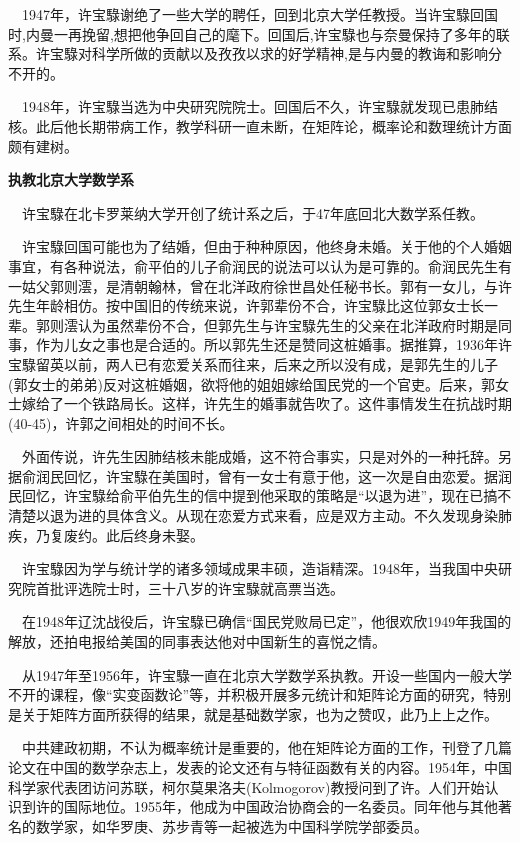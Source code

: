 $\quad$1947年，许宝騄谢绝了一些大学的聘任，回到北京大学任教授。当许宝騄回国时,内曼一再挽留,想把他争回自己的麾下。回国后,许宝騄也与奈曼保持了多年的联系。许宝騄对科学所做的贡献以及孜孜以求的好学精神,是与内曼的教诲和影响分不开的。

$\quad$1948年，许宝騄当选为中央研究院院士。回国后不久，许宝騄就发现已患肺结核。此后他长期带病工作，教学科研一直未断，在矩阵论，概率论和数理统计方面颇有建树。

\textbf{执教北京大学数学系}

$\quad$许宝騄在北卡罗莱纳大学开创了统计系之后，于47年底回北大数学系任教。

$\quad$许宝騄回国可能也为了结婚，但由于种种原因，他终身未婚。关于他的个人婚姻事宜，有各种说法，俞平伯的儿子俞润民的说法可以认为是可靠的。俞润民先生有一姑父郭则澐，是清朝翰林，曾在北洋政府徐世昌处任秘书长。郭有一女儿，与许先生年龄相仿。按中国旧的传统来说，许郭辈份不合，许宝騄比这位郭女士长一辈。郭则澐认为虽然辈份不合，但郭先生与许宝騄先生的父亲在北洋政府时期是同事，作为儿女之事也是合适的。所以郭先生还是赞同这桩婚事。据推算，1936年许宝騄留英以前，两人已有恋爱关系而往来，后来之所以没有成，是郭先生的儿子(郭女士的弟弟)反对这桩婚姻，欲将他的姐姐嫁给国民党的一个官吏。后来，郭女士嫁给了一个铁路局长。这样，许先生的婚事就告吹了。这件事情发生在抗战时期(40-45)，许郭之间相处的时间不长。

$\quad$外面传说，许先生因肺结核未能成婚，这不符合事实，只是对外的一种托辞。另据俞润民回忆，许宝騄在美国时，曾有一女士有意于他，这一次是自由恋爱。据润民回忆，许宝騄给俞平伯先生的信中提到他采取的策略是“以退为进”，现在已搞不清楚以退为进的具体含义。从现在恋爱方式来看，应是双方主动。不久发现身染肺疾，乃复废约。此后终身未娶。

$\quad$许宝騄因为学与统计学的诸多领域成果丰硕，造诣精深。1948年，当我国中央研究院首批评选院士时，三十八岁的许宝騄就高票当选。

$\quad$在1948年辽沈战役后，许宝騄已确信“国民党败局已定”，他很欢欣1949年我国的解放，还拍电报给美国的同事表达他对中国新生的喜悦之情。

$\quad$从1947年至1956年，许宝騄一直在北京大学数学系执教。开设一些国内一般大学不开的课程，像“实变函数论”等，并积极开展多元统计和矩阵论方面的研究，特别是关于矩阵方面所获得的结果，就是基础数学家，也为之赞叹，此乃上上之作。

$\quad$中共建政初期，不认为概率统计是重要的，他在矩阵论方面的工作，刊登了几篇论文在中国的数学杂志上，发表的论文还有与特征函数有关的内容。1954年，中国科学家代表团访问苏联，柯尔莫果洛夫(Kolmogorov)教授问到了许。人们开始认识到许的国际地位。1955年，他成为中国政治协商会的一名委员。同年他与其他著名的数学家，如华罗庚、苏步青等一起被选为中国科学院学部委员。

